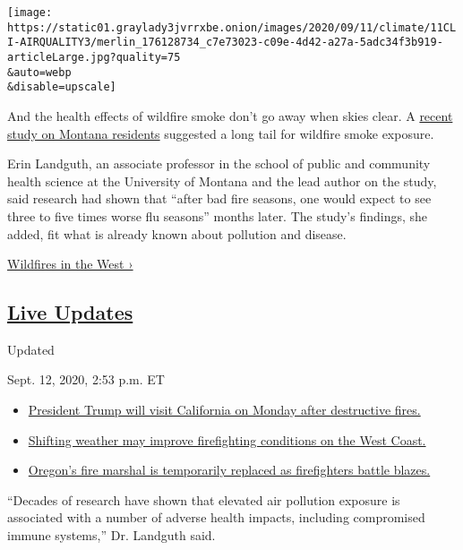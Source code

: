 \texttt{[image: https://static01.graylady3jvrrxbe.onion/images/2020/09/11/climate/11CLI-AIRQUALITY3/merlin\_176128734\_c7e73023-c09e-4d42-a27a-5adc34f3b919-articleLarge.jpg?quality=75\\\&auto=webp\\\&disable=upscale]}

And the health effects of wildfire smoke don't go away when skies clear.
A
\href{https://www.sciencedirect.com/science/article/pii/S0160412019326935}{recent
study on Montana residents} suggested a long tail for wildfire smoke
exposure.

Erin Landguth, an associate professor in the school of public and
community health science at the University of Montana and the lead
author on the study, said research had shown that ``after bad fire
seasons, one would expect to see three to five times worse flu seasons''
months later. The study's findings, she added, fit what is already known
about pollution and disease.

\href{https://www.nytimes3xbfgragh.onion/spotlight/california-wildfires}{Wildfires
in the West ›}

\hypertarget{live-updates}{%
\subsection{\texorpdfstring{\href{https://www.nytimes3xbfgragh.onion/2020/09/12/us/wildfires-live-updates.html}{Live
Updates}}{Live Updates}}\label{live-updates}}

Updated~

Sept. 12, 2020, 2:53 p.m. ET

\begin{itemize}
\tightlist
\item
  \href{https://www.nytimes3xbfgragh.onion/2020/09/12/us/wildfires-live-updates.html\#link-f3961ff}{President
  Trump will visit California on Monday after destructive fires.}
\item
  \href{https://www.nytimes3xbfgragh.onion/2020/09/12/us/wildfires-live-updates.html\#link-7e503ae9}{Shifting
  weather may improve firefighting conditions on the West Coast.}
\item
  \href{https://www.nytimes3xbfgragh.onion/2020/09/12/us/wildfires-live-updates.html\#link-5e4c548d}{Oregon's
  fire marshal is temporarily replaced as firefighters battle blazes.}
\end{itemize}

``Decades of research have shown that elevated air pollution exposure is
associated with a number of adverse health impacts, including
compromised immune systems,'' Dr. Landguth said.


